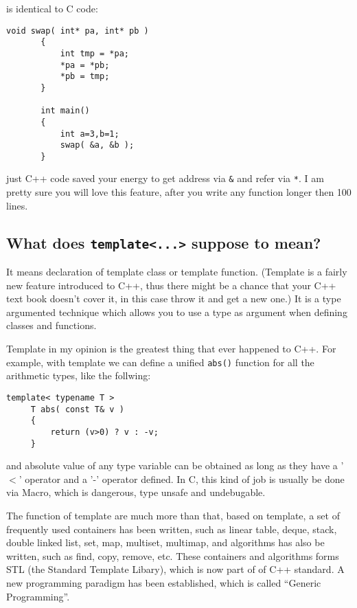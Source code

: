 \documentclass[letterpaper]{book}
\begin{document}
is identical to C code:

\begin{lstlisting}[frame=single]
       void swap( int* pa, int* pb )
       {
           int tmp = *pa;
           *pa = *pb;
           *pb = tmp;
       }

       int main()
       {
           int a=3,b=1;
           swap( &a, &b );
       }

\end{lstlisting}

just C++ code saved your energy to get address via \lstinline$&$ and refer 
via \lstinline$*$. I am pretty sure you will love this feature, after you 
write any function longer then 100 lines.


\subsection*{What does \lstinline$template<...>$ suppose to mean?}
  It means declaration of template class or template function. (Template is a 
fairly new feature introduced to C++, thus there might be a chance that your
C++ text book doesn't cover it, in this case throw it and get a new one.) 
It is a type argumented technique which allows you to use a type as argument 
when defining classes and functions. 

  Template in my opinion is the greatest thing that ever happened to C++. 
For example, with template we can define a unified \lstinline$abs()$ 
function for all the arithmetic types, like the follwing:

\begin{lstlisting}[frame=single]
     template< typename T >
     T abs( const T& v )
     {
         return (v>0) ? v : -v;
     }
\end{lstlisting}

and absolute value of any type variable can be obtained as long as they have
a '$<$' operator and a '-' operator defined. In C, this kind of job is usually
be done via Macro, which is dangerous, type unsafe and undebugable. 

The function of template are much more than that, based on template, a set of 
frequently used containers has been written, such as linear table, deque, 
stack, double linked list, set, map, multiset, multimap, and algorithms 
has also be written, such as find, copy, remove, etc. These containers and 
algorithms forms STL (the Standard Template Libary), which is now part of
of C++ standard. A new programming paradigm has been established, which is
called ``Generic Programming''. 
\end{document}
